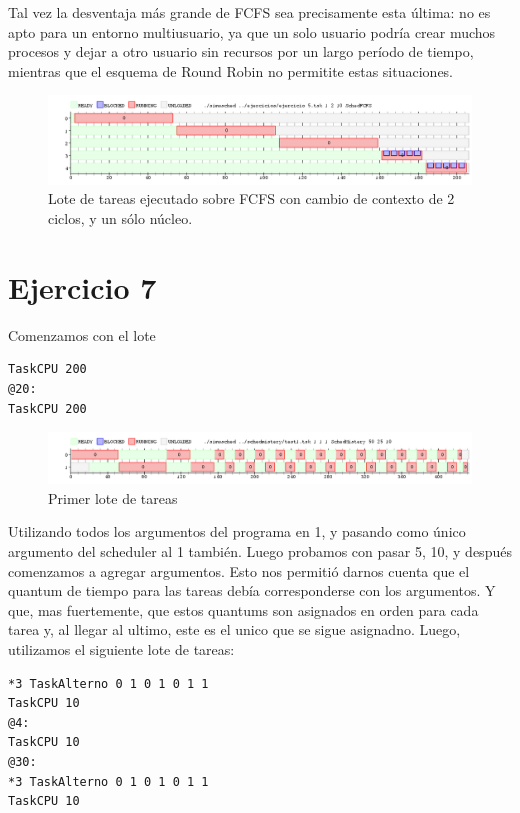 \documentclass{article}
\begin{document}
Tal vez la desventaja más grande de FCFS sea precisamente esta última: no es apto para un entorno multiusuario, ya que un solo usuario podría crear muchos procesos y dejar a otro usuario sin recursos por un largo período de tiempo, mientras que el esquema de Round Robin no permitite estas situaciones.

\begin{figure}[h!]
\caption{Lote de tareas ejecutado sobre FCFS con cambio de contexto de 2 ciclos, y un sólo núcleo. \label{grf:ex6-1}}
\centering
\includegraphics[width=15cm]{../ejercicios/ejercicio 6 - quantum 2}
\end{figure}

\section{Ejercicio 7}

Comenzamos con el lote

\begin{verbatim}
TaskCPU 200
@20:
TaskCPU 200
\end{verbatim}

\begin{figure}[h!]
\caption{Primer lote de tareas \label{grf:ex7-1}}
\centering
\includegraphics[width=15cm]{../ejercicios/ejercicio 7-1}
\end{figure}

Utilizando todos los argumentos del programa en 1, y pasando como único argumento del scheduler al 1 también. Luego probamos con pasar 5, 10, y después comenzamos a agregar argumentos. Esto nos permitió darnos cuenta que el quantum de tiempo para las tareas debía corresponderse con los argumentos. Y que, mas fuertemente, que estos quantums son asignados en orden para cada tarea y, al llegar al ultimo, este es el unico que se sigue asignadno. Luego, utilizamos el siguiente lote de tareas:

\begin{verbatim}
*3 TaskAlterno 0 1 0 1 0 1 1
TaskCPU 10
@4:
TaskCPU 10
@30:
*3 TaskAlterno 0 1 0 1 0 1 1
TaskCPU 10
\end{verbatim}
\end{document}
